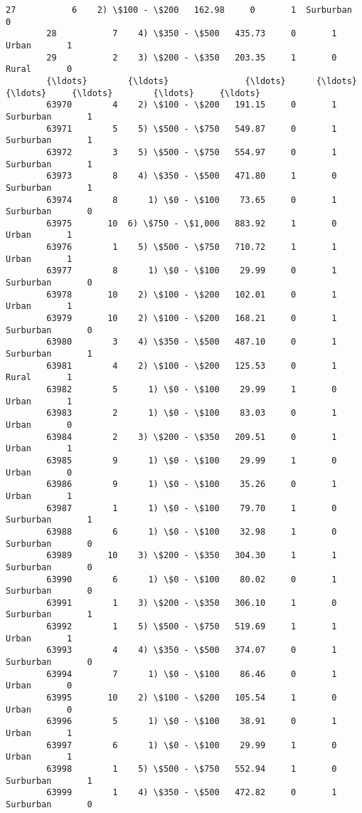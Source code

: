 \documentclass[11pt]{article}
\begin{document}
\begin{Verbatim}[commandchars=\\\{\}]
        27           6    2) \$100 - \$200   162.98     0       1  Surburban       0   
        28           7    4) \$350 - \$500   435.73     0       1      Urban       1   
        29           2    3) \$200 - \$350   203.35     1       0      Rural       0   
        {\ldots}        {\ldots}               {\ldots}      {\ldots}   {\ldots}     {\ldots}        {\ldots}     {\ldots}   
        63970        4    2) \$100 - \$200   191.15     0       1  Surburban       1   
        63971        5    5) \$500 - \$750   549.87     0       1  Surburban       1   
        63972        3    5) \$500 - \$750   554.97     0       1  Surburban       1   
        63973        8    4) \$350 - \$500   471.80     1       0  Surburban       1   
        63974        8      1) \$0 - \$100    73.65     0       1  Surburban       0   
        63975       10  6) \$750 - \$1,000   883.92     1       0      Urban       1   
        63976        1    5) \$500 - \$750   710.72     1       1      Urban       1   
        63977        8      1) \$0 - \$100    29.99     0       1  Surburban       0   
        63978       10    2) \$100 - \$200   102.01     0       1      Urban       1   
        63979       10    2) \$100 - \$200   168.21     0       1  Surburban       0   
        63980        3    4) \$350 - \$500   487.10     0       1  Surburban       1   
        63981        4    2) \$100 - \$200   125.53     0       1      Rural       1   
        63982        5      1) \$0 - \$100    29.99     1       0      Urban       1   
        63983        2      1) \$0 - \$100    83.03     0       1      Urban       0   
        63984        2    3) \$200 - \$350   209.51     0       1      Urban       1   
        63985        9      1) \$0 - \$100    29.99     1       0      Urban       0   
        63986        9      1) \$0 - \$100    35.26     0       1      Urban       1   
        63987        1      1) \$0 - \$100    79.70     1       0  Surburban       1   
        63988        6      1) \$0 - \$100    32.98     1       0  Surburban       0   
        63989       10    3) \$200 - \$350   304.30     1       1  Surburban       0   
        63990        6      1) \$0 - \$100    80.02     0       1  Surburban       0   
        63991        1    3) \$200 - \$350   306.10     1       0  Surburban       1   
        63992        1    5) \$500 - \$750   519.69     1       1      Urban       1   
        63993        4    4) \$350 - \$500   374.07     0       1  Surburban       0   
        63994        7      1) \$0 - \$100    86.46     0       1      Urban       0   
        63995       10    2) \$100 - \$200   105.54     1       0      Urban       0   
        63996        5      1) \$0 - \$100    38.91     0       1      Urban       1   
        63997        6      1) \$0 - \$100    29.99     1       0      Urban       1   
        63998        1    5) \$500 - \$750   552.94     1       0  Surburban       1   
        63999        1    4) \$350 - \$500   472.82     0       1  Surburban       0   
        

\end{Verbatim}
\end{document}
